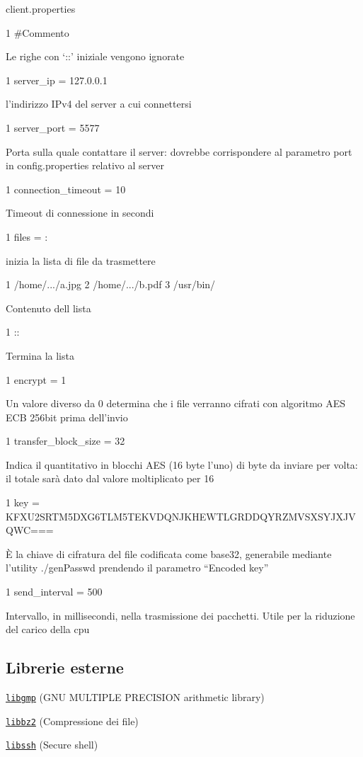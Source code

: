 client.\+properties 
\begin{DoxyCode}
1 #Commento
\end{DoxyCode}
 Le righe con ‘\+::’ iniziale vengono ignorate 
\begin{DoxyCode}
1 server\_ip = 127.0.0.1
\end{DoxyCode}
 l’indirizzo I\+Pv4 del server a cui connettersi 
\begin{DoxyCode}
1 server\_port = 5577
\end{DoxyCode}
 Porta sulla quale contattare il server\+: dovrebbe corrispondere al parametro port in config.\+properties relativo al server 
\begin{DoxyCode}
1 connection\_timeout = 10
\end{DoxyCode}
 Timeout di connessione in secondi 
\begin{DoxyCode}
1 files = :
\end{DoxyCode}
 inizia la lista di file da trasmettere 
\begin{DoxyCode}
1 /home/.../a.jpg
2 /home/.../b.pdf
3 /usr/bin/
\end{DoxyCode}
 Contenuto dell lista 
\begin{DoxyCode}
1 ::
\end{DoxyCode}
 Termina la lista 
\begin{DoxyCode}
1 encrypt = 1
\end{DoxyCode}


Un valore diverso da 0 determina che i file verranno cifrati con algoritmo A\+ES E\+CB 256bit prima dell’invio 
\begin{DoxyCode}
1 transfer\_block\_size = 32
\end{DoxyCode}
 Indica il quantitativo in blocchi A\+ES (16 byte l’uno) di byte da inviare per volta\+: il totale sarà dato dal valore moltiplicato per 16 
\begin{DoxyCode}
1 key = KFXU2SRTM5DXG6TLM5TEKVDQNJKHEWTLGRDDQYRZMVSXSYJXJVQWC===
\end{DoxyCode}
 È la chiave di cifratura del file codificata come base32, generabile mediante l’utility ./gen\+Passwd prendendo il parametro “\+Encoded key” 
\begin{DoxyCode}
1 send\_interval = 500
\end{DoxyCode}
 Intervallo, in millisecondi, nella trasmissione dei pacchetti. Utile per la riduzione del carico della cpu

\subsection*{Librerie esterne}


\begin{DoxyItemize}
\item \href{https://gmplib.org/}{\tt libgmp} (G\+NU M\+U\+L\+T\+I\+P\+LE P\+R\+E\+C\+I\+S\+I\+ON arithmetic library)
\item \href{http://www.bzip.org/}{\tt libbz2} (Compressione dei file)
\item \href{https://www.libssh.org/}{\tt libssh} (Secure shell) 
\end{DoxyItemize}